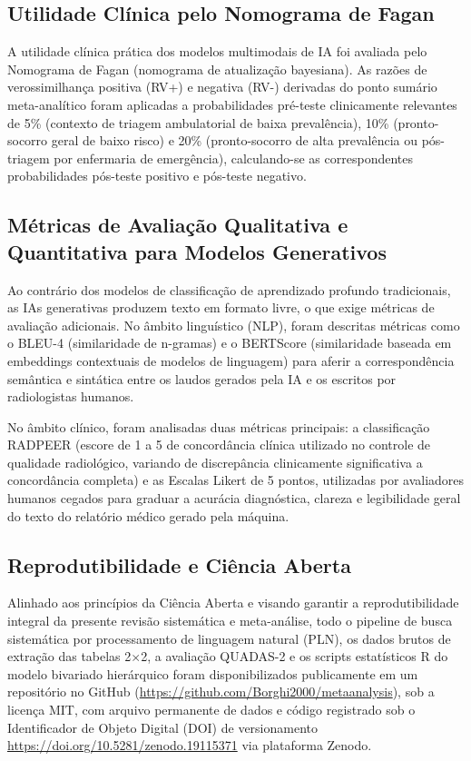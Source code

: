 \documentclass[12pt,a4paper]{article}
\begin{document}
\subsection{Utilidade Clínica pelo Nomograma de Fagan}
A utilidade clínica prática dos modelos multimodais de IA foi avaliada pelo Nomograma de Fagan (nomograma de atualização bayesiana). As razões de verossimilhança positiva (RV+) e negativa (RV-) derivadas do ponto sumário meta-analítico foram aplicadas a probabilidades pré-teste clinicamente relevantes de 5\% (contexto de triagem ambulatorial de baixa prevalência), 10\% (pronto-socorro geral de baixo risco) e 20\% (pronto-socorro de alta prevalência ou pós-triagem por enfermaria de emergência), calculando-se as correspondentes probabilidades pós-teste positivo e pós-teste negativo.

\subsection{Métricas de Avaliação Qualitativa e Quantitativa para Modelos Generativos}
Ao contrário dos modelos de classificação de aprendizado profundo tradicionais, as IAs generativas produzem texto em formato livre, o que exige métricas de avaliação adicionais. No âmbito linguístico (NLP), foram descritas métricas como o BLEU-4 (similaridade de n-gramas) e o BERTScore (similaridade baseada em embeddings contextuais de modelos de linguagem) para aferir a correspondência semântica e sintática entre os laudos gerados pela IA e os escritos por radiologistas humanos. 

No âmbito clínico, foram analisadas duas métricas principais: a classificação RADPEER (escore de 1 a 5 de concordância clínica utilizado no controle de qualidade radiológico, variando de discrepância clinicamente significativa a concordância completa) e as Escalas Likert de 5 pontos, utilizadas por avaliadores humanos cegados para graduar a acurácia diagnóstica, clareza e legibilidade geral do texto do relatório médico gerado pela máquina.

\subsection{Reprodutibilidade e Ciência Aberta}
Alinhado aos princípios da Ciência Aberta e visando garantir a reprodutibilidade integral da presente revisão sistemática e meta-análise, todo o pipeline de busca sistemática por processamento de linguagem natural (PLN), os dados brutos de extração das tabelas 2$\times$2, a avaliação QUADAS-2 e os scripts estatísticos R do modelo bivariado hierárquico foram disponibilizados publicamente em um repositório no GitHub (\url{https://github.com/Borghi2000/metaanalysis}), sob a licença MIT, com arquivo permanente de dados e código registrado sob o Identificador de Objeto Digital (DOI) de versionamento \url{https://doi.org/10.5281/zenodo.19115371} via plataforma Zenodo.
\end{document}
